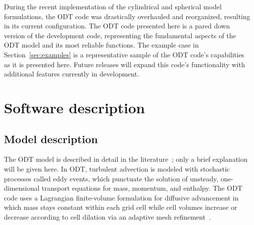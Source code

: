 \documentclass[preprint,12pt, a4paper]{elsarticle}
\begin{document}
During the recent implementation of the cylindrical and spherical model formulations, the ODT code was drastically overhauled and reorganized, resulting in its current configuration. The ODT code presented here is a pared down version of the development code, representing the fundamental aspects of the ODT model and its most reliable functions. The example case in Section~\ref{sec:examples} is a representative sample of the ODT code's capabilities as it is presented here. Future releases will expand this code's functionality with additional features currently in development. 

\section{Software description}
\label{sec:description}

\subsection{Model description}
\label{sub:model_description}

The ODT model is described in detail in the literature~\cite{Kerstein_1999,Kerstein_2001,Ashurst_2005,Lignell_2018,Lignell_2013}; only a brief explanation will be given here. In ODT, turbulent advection is modeled with stochastic processes called eddy events, which punctuate the solution of unsteady, one-dimensional transport equations for mass, momentum, and enthalpy. The ODT code uses a Lagrangian finite-volume formulation for diffusive advancement in which mass stays constant within each grid cell while cell volumes increase or decrease according to cell dilation via an adaptive mesh refinement~\cite{Lignell_2013}.
\end{document}
